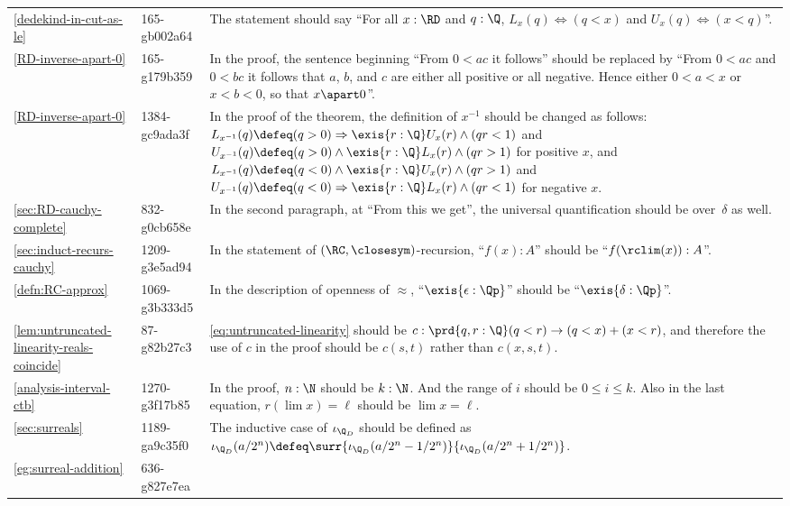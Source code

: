 \documentclass[
%
%
11pt %
]{article}
\begin{document}
\begin{longtable}{llp{10.5cm}}
  \cref{dedekind-in-cut-as-le}
  & 165-gb002a64
  & The statement should say ``For all $x : \RD$ and $q : \Q$, $L_x(q) \Leftrightarrow (q < x)$ and $U_x(q)
  \Leftrightarrow (x < q)$''.\\
  \cref{RD-inverse-apart-0}
  & 165-g179b359
  & In the proof, the sentence beginning ``From $0<ac$ it follows'' should be replaced by ``From $0 < a c$ and $0 < b c$ it follows
  that $a$, $b$, and $c$ are either all positive or all negative.
  Hence either $0 < a < x$ or $x < b < 0$, so that $x \apart 0$''.\\
  \cref{RD-inverse-apart-0}
  & 1384-gc9ada3f
  & In the proof of the theorem, the definition of $x^{-1}$ should be changed as follows:
  $L_{x^{-1}}(q) \defeq (q > 0) \Rightarrow \exis{r : \Q} U_x(r) \land (q r < 1)$ and $U_{x^{-1}}(q) \defeq (q > 0) \land \exis{r : \Q} L_x(r) \land (q r > 1)$ for positive $x$,
  and $L_{x^{-1}}(q) \defeq (q < 0) \land \exis{r : \Q} U_x(r) \land (q r > 1)$ and $U_{x^{-1}}(q) \defeq (q < 0) \Rightarrow \exis{r : \Q} L_x(r) \land (q r < 1)$ for negative $x$. \\
  \cref{sec:RD-cauchy-complete}
  & 832-g0cb658e
  & In the second paragraph, at ``From this we get'', the universal quantification should be over~$\delta$ as well.\\
  \cref{sec:induct-recurs-cauchy}
  & 1209-g3e5ad94
  & In the statement of $(\RC,\closesym)$-recursion, ``$f(x) : A$'' should be ``$f(\rclim(x)) : A$''.\\
  \cref{defn:RC-approx}
  & 1069-g3b333d5
  & In the description of openness of $\approx$, ``$\exis{\epsilon : \Qp}$'' should be ``$\exis{\delta : \Qp}$''.\\
  \cref{lem:untruncated-linearity-reals-coincide}
  & 87-g82b27c3
  & \eqref{eq:untruncated-linearity} should be $c:\prd{q, r : \Q} (q < r) \to (q < x) + (x < r)$, and therefore the use of $c$ in the proof should be $c(s,t)$ rather than $c(x,s,t)$.\\
  \cref{analysis-interval-ctb}
  & 1270-g3f17b85
  & In the proof, $n : \N$ should be $k : \N$. And the range of $i$ should be $0 \leq i \leq k$. Also in the last equation, $r(\lim x) = \ell$ should be $\lim x = \ell$.\\
  \cref{sec:surreals}
  & 1189-ga9c35f0
  & The inductive case of $\iota_{\Q_D}$ should be defined as $\iota_{\Q_D}(a/2^n) \defeq \surr{\iota_{\Q_D}(a/2^n - 1/2^n)}{\iota_{\Q_D}(a/2^n + 1/2^n)}$.\\
  \cref{eg:surreal-addition}
  & 636-g827e7ea

\end{longtable}
\end{document}
